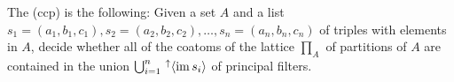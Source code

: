 \documentclass[12pt]{amsart}
\numberwithin{equation}{section}
\theoremstyle{plain}
\theoremstyle{definition}
\newcommand{\ccp}{\acs{ccp}\xspace}
\begin{document}
The  (\ccp) is the following:
Given a set $A$ and a list
$s_1 = (a_1, b_1, c_1), s_2=(a_2, b_2, c_2), \dots, s_n =(a_n, b_n, c_n)$
of triples with elements in $A$, decide whether all of the coatoms
of the lattice $\prod_A$ of partitions of $A$ are contained in the union
$ \bigcup_{i=1}^n \, ^\uparrow\langle \operatorname{im} s_i \rangle$ of principal filters.




\printbibliography
\end{document}

